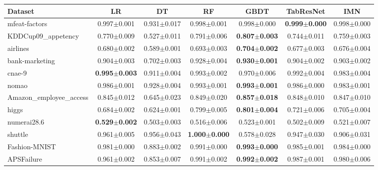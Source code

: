 \begin{tabular}{lcccccc}
\toprule
Dataset & LR & DT & RF & GBDT & TabResNet & IMN \\
\midrule
mfeat-factors & 0.997{\tiny$\pm$0.001} & 0.931{\tiny$\pm$0.017} & 0.998{\tiny$\pm$0.001} & 0.998{\tiny$\pm$0.000} & \textbf{0.999{\tiny$\pm$0.000}} & 0.998{\tiny$\pm$0.000} \\
KDDCup09\_appetency & 0.770{\tiny$\pm$0.009} & 0.527{\tiny$\pm$0.011} & 0.791{\tiny$\pm$0.006} & \textbf{0.807{\tiny$\pm$0.003}} & 0.744{\tiny$\pm$0.011} & 0.759{\tiny$\pm$0.003} \\
airlines & 0.680{\tiny$\pm$0.002} & 0.589{\tiny$\pm$0.001} & 0.693{\tiny$\pm$0.003} & \textbf{0.704{\tiny$\pm$0.002}} & 0.677{\tiny$\pm$0.003} & 0.676{\tiny$\pm$0.004} \\
bank-marketing & 0.904{\tiny$\pm$0.003} & 0.702{\tiny$\pm$0.003} & 0.928{\tiny$\pm$0.004} & \textbf{0.930{\tiny$\pm$0.001}} & 0.904{\tiny$\pm$0.002} & 0.903{\tiny$\pm$0.002} \\
cnae-9 & \textbf{0.995{\tiny$\pm$0.003}} & 0.911{\tiny$\pm$0.004} & 0.993{\tiny$\pm$0.002} & 0.970{\tiny$\pm$0.006} & 0.992{\tiny$\pm$0.004} & 0.983{\tiny$\pm$0.004} \\
nomao & 0.986{\tiny$\pm$0.001} & 0.928{\tiny$\pm$0.004} & 0.993{\tiny$\pm$0.001} & \textbf{0.993{\tiny$\pm$0.001}} & 0.986{\tiny$\pm$0.000} & 0.983{\tiny$\pm$0.001} \\
Amazon\_employee\_access & 0.845{\tiny$\pm$0.012} & 0.645{\tiny$\pm$0.023} & 0.849{\tiny$\pm$0.020} & \textbf{0.857{\tiny$\pm$0.018}} & 0.848{\tiny$\pm$0.010} & 0.847{\tiny$\pm$0.010} \\
higgs & 0.684{\tiny$\pm$0.002} & 0.624{\tiny$\pm$0.001} & 0.799{\tiny$\pm$0.005} & \textbf{0.801{\tiny$\pm$0.004}} & 0.721{\tiny$\pm$0.006} & 0.705{\tiny$\pm$0.004} \\
numerai28.6 & \textbf{0.529{\tiny$\pm$0.002}} & 0.503{\tiny$\pm$0.003} & 0.516{\tiny$\pm$0.006} & 0.523{\tiny$\pm$0.001} & 0.502{\tiny$\pm$0.009} & 0.521{\tiny$\pm$0.007} \\
shuttle & 0.961{\tiny$\pm$0.005} & 0.956{\tiny$\pm$0.043} & \textbf{1.000{\tiny$\pm$0.000}} & 0.578{\tiny$\pm$0.028} & 0.947{\tiny$\pm$0.030} & 0.906{\tiny$\pm$0.031} \\
Fashion-MNIST & 0.981{\tiny$\pm$0.000} & 0.883{\tiny$\pm$0.002} & 0.991{\tiny$\pm$0.000} & \textbf{0.993{\tiny$\pm$0.000}} & 0.985{\tiny$\pm$0.001} & 0.984{\tiny$\pm$0.000} \\
APSFailure & 0.961{\tiny$\pm$0.002} & 0.853{\tiny$\pm$0.007} & 0.991{\tiny$\pm$0.002} & \textbf{0.992{\tiny$\pm$0.002}} & 0.987{\tiny$\pm$0.001} & 0.980{\tiny$\pm$0.006} \\

\end{tabular}

